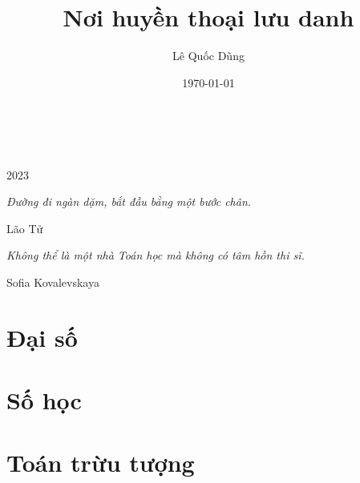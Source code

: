 \documentclass[oneside]{book}
\title{Nơi huyền thoại lưu danh}
\author{Lê Quốc Dũng}
\date{\today}
\begin{document}
\begin{titlepage}
		\\
			
		\vspace{10mm}
		\\
		\vspace{\fill}
		\centering \large{2023}
\end{titlepage}

\newpage

\vspace*{2cm}

\begin{center}
	{\Large 
			\textit{Đường đi ngàn dặm, bắt đầu bằng một bước chân.}
	}
	\Large{\parbox{10cm}{
		\begin{raggedleft}
		\vspace{.5cm}\hfill{Lão Tử}
		\end{raggedleft}
	}
}
\end{center}

\begin{center}
	{\Large 
			\textit{Không thể là một nhà Toán học mà không có tâm hồn thi sĩ.}
	}
	\Large{\parbox{10cm}{
		\begin{raggedleft}
		\vspace{.5cm}\hfill{Sofia Kovalevskaya}
		\end{raggedleft}
	}
}
\end{center}

\newpage

\tableofcontents

\newpage



\part{Đại số}



\part{Số học}



\part{Toán trừu tượng}




%
\end{document}
